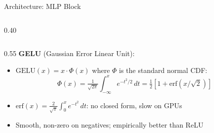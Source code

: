 \begin{frame}{Architecture: MLP Block}
\begin{columns}
\begin{column}{0.40\textwidth}
    \end{column}
  \end{columns}

  \vspace{0.2em}
  \begin{columns}
    \begin{column}{0.55\textwidth}
      \textbf{GELU} (Gaussian Error Linear Unit):
      \begin{itemize}
        \itemsep0.15em
        \item $\mathrm{GELU}(x) = x \cdot \Phi(x)$ where $\Phi$ is the standard normal CDF:
          \[
            \Phi(x) = \tfrac{1}{\sqrt{2\pi}} \int_{-\infty}^x e^{-t^2/2}\,dt
                   = \tfrac{1}{2}\!\left[1 + \mathrm{erf}(x/\sqrt{2})\right]
          \]
        \item $\mathrm{erf}(x) = \tfrac{2}{\sqrt{\pi}}\int_0^x e^{-t^2}\,dt$: no closed form, slow on GPUs
        \item Smooth, non-zero on negatives; empirically better than ReLU
      \end{itemize}


\end{column}
\end{columns}
\end{frame}
